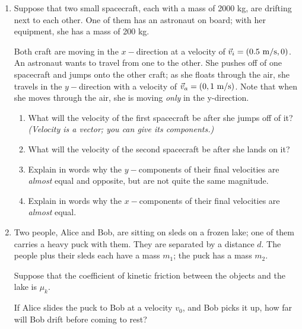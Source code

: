 \documentclass[12pt]{article}
\begin{document}
\Large
\centerline{}

\normalsize
\centerline{}

\begin{enumerate}

\item Suppose that two small spacecraft, each with a mass of 2000 kg, are drifting next to each other. One of them has an astronaut on board; with her equipment, she has a mass of 200 kg. 

	Both craft are moving in the $x-$direction at a velocity of $\vec v_i = (0.5~\rm m/\rm s, 0)$. An astronaut wants to travel from one to the other. She pushes off of one spacecraft and jumps onto the other craft; as she floats through the air, she travels in the $y-$direction with a velocity of $\vec v_a = (0, 1~\rm m/\rm s)$. Note that when she moves through the air, she is moving {\it only} in the y-direction.


		\begin{enumerate}
			\item What will the velocity of the first spacecraft be after she jumps off of it? {\it (Velocity is a vector; you can give its components.)}

			
			\item What will the velocity of the second spacecraft be after she lands on it?
			

			\item Explain in words why the $y-$components of their final velocities are {\it almost} equal and opposite, but are not quite the same magnitude.

			\item Explain in words why the $x-$components of their final velocities are {\it almost} equal. 
		\end{enumerate}

\bigskip

\item Two people, Alice and Bob, are sitting on sleds on a frozen lake; one of them carries a heavy puck with them. They are separated by a distance $d$. The people plus their sleds each have a mass $m_1$; the puck has a mass $m_2$.

	Suppose that the coefficient of kinetic friction between the objects and the lake is $\mu_k$.

	If Alice slides the puck to Bob at a velocity $v_0$, and Bob picks it up, how far will Bob drift before coming to rest?


\end{enumerate}
\end{document}
